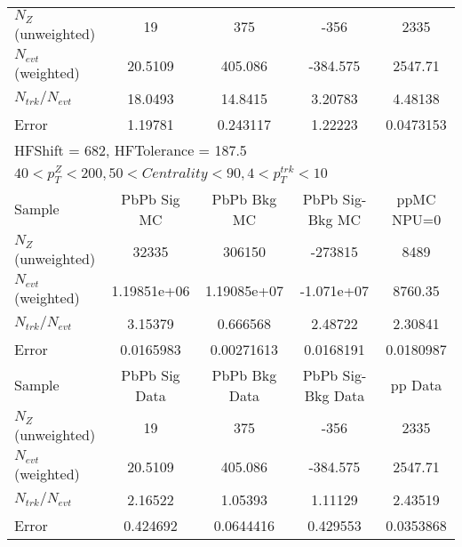 \begin{table}[h!]
\begin{tabular}{|l|c|c|c|c|}
$N_Z$ (unweighted)& 19             & 375            & -356           & 2335           \\
$N_{evt}$ (weighted)& 20.5109        & 405.086        & -384.575       & 2547.71        \\
$N_{trk}/N_{evt}$& 18.0493        & 14.8415        & 3.20783        & 4.48138        \\
Error          & 1.19781        & 0.243117       & 1.22223        & 0.0473153      \\
\hline\hline
\multicolumn{5}{l}{ HFShift = 682, HFTolerance = 187.5}\\
\multicolumn{5}{l}{ $40 < p_{T}^{Z} < 200, 50 < Centrality < 90, 4 < p_{T}^{trk} < 10$}\\
\hline\hline
Sample         & PbPb Sig MC    & PbPb Bkg MC    & PbPb Sig-Bkg MC& ppMC NPU=0     \\
$N_Z$ (unweighted)& 32335          & 306150         & -273815        & 8489           \\
$N_{evt}$ (weighted)& 1.19851e+06    & 1.19085e+07    & -1.071e+07     & 8760.35        \\
$N_{trk}/N_{evt}$& 3.15379        & 0.666568       & 2.48722        & 2.30841        \\
Error          & 0.0165983      & 0.00271613     & 0.0168191      & 0.0180987      \\
\hline
Sample         & PbPb Sig Data  & PbPb Bkg Data  & PbPb Sig-Bkg Data& pp Data  \\
$N_Z$ (unweighted)& 19             & 375            & -356           & 2335           \\
$N_{evt}$ (weighted)& 20.5109        & 405.086        & -384.575       & 2547.71        \\
$N_{trk}/N_{evt}$& 2.16522        & 1.05393        & 1.11129        & 2.43519        \\
Error          & 0.424692       & 0.0644416      & 0.429553       & 0.0353868      \\
\hline\hline
\end{tabular}
\end{table}
\clearpage
